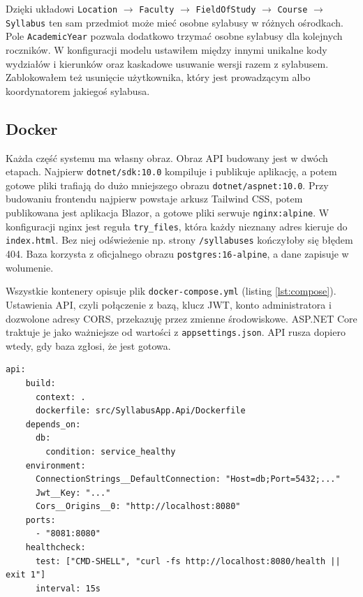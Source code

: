 \documentclass[times]{san}
\begin{document}
Dzięki układowi \texttt{Location} $\rightarrow$ \texttt{Faculty} $\rightarrow$ \texttt{FieldOfStudy} $\rightarrow$ \texttt{Course} $\rightarrow$ \texttt{Syllabus} ten sam przedmiot może mieć osobne sylabusy w różnych ośrodkach. Pole \texttt{AcademicYear} pozwala dodatkowo trzymać osobne sylabusy dla kolejnych roczników. W konfiguracji modelu ustawiłem między innymi unikalne kody wydziałów i kierunków oraz kaskadowe usuwanie wersji razem z sylabusem. Zablokowałem też usunięcie użytkownika, który jest prowadzącym albo koordynatorem jakiegoś sylabusa.

\subsection{Docker}

Każda część systemu ma własny obraz. Obraz API budowany jest w dwóch etapach. Najpierw \texttt{dotnet/sdk:10.0} kompiluje i publikuje aplikację, a potem gotowe pliki trafiają do dużo mniejszego obrazu \texttt{dotnet/aspnet:10.0}. Przy budowaniu frontendu najpierw powstaje arkusz Tailwind CSS, potem publikowana jest aplikacja Blazor, a gotowe pliki serwuje \texttt{nginx:alpine}. W konfiguracji nginx jest reguła \texttt{try\_files}, która każdy nieznany adres kieruje do \texttt{index.html}. Bez niej odświeżenie np. strony \texttt{/syllabuses} kończyłoby się błędem 404. Baza korzysta z oficjalnego obrazu \texttt{postgres:16-alpine}, a dane zapisuje w wolumenie.

Wszystkie kontenery opisuje plik \texttt{docker-compose.yml} (listing \ref{lst:compose}). Ustawienia API, czyli połączenie z bazą, klucz JWT, konto administratora i dozwolone adresy CORS, przekazuję przez zmienne środowiskowe. ASP.NET Core traktuje je jako ważniejsze od wartości z \texttt{appsettings.json}. API rusza dopiero wtedy, gdy baza zgłosi, że jest gotowa.

\begin{lstlisting}[caption={Fragment pliku \texttt{docker-compose.yml}}, label={lst:compose}]
  api:
    build:
      context: .
      dockerfile: src/SyllabusApp.Api/Dockerfile
    depends_on:
      db:
        condition: service_healthy
    environment:
      ConnectionStrings__DefaultConnection: "Host=db;Port=5432;..."
      Jwt__Key: "..."
      Cors__Origins__0: "http://localhost:8080"
    ports:
      - "8081:8080"
    healthcheck:
      test: ["CMD-SHELL", "curl -fs http://localhost:8080/health || exit 1"]
      interval: 15s
\end{lstlisting}
\end{document}
